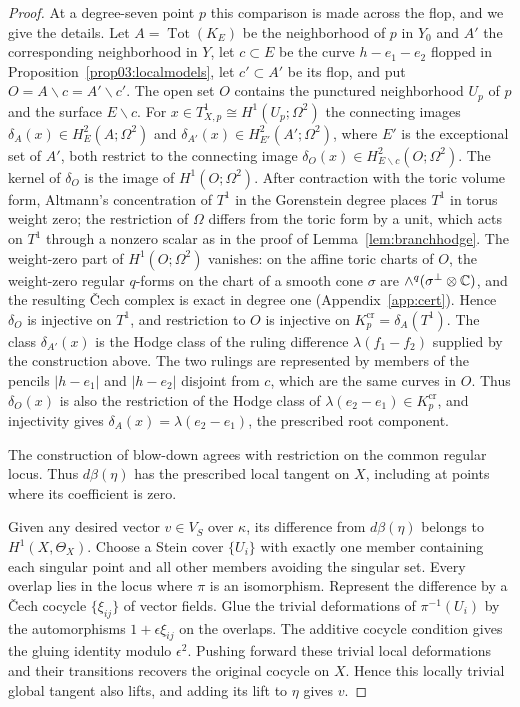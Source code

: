 \begin{proof}
At a degree-seven point $p$ this comparison is made across the flop, and we
give the details.  Let $A=\operatorname{Tot}(K_E)$ be the neighborhood of
$p$ in $Y_0$ and $A'$ the corresponding neighborhood in $Y$, let
$c\subset E$ be the curve $h-e_1-e_2$ flopped in
Proposition~\ref{prop03:localmodels}, let $c'\subset A'$ be its flop, and put
$O=A\smallsetminus c=A'\smallsetminus c'$.  The open set $O$ contains the
punctured neighborhood $U_p$ of $p$ and the surface $E\smallsetminus c$.
For $x\in T^1_{X,p}\cong H^1(U_p;\Omega^2)$ the connecting images
$\delta_A(x)\in H^2_E(A;\Omega^2)$ and
$\delta_{A'}(x)\in H^2_{E'}(A';\Omega^2)$, where $E'$ is the exceptional set of
$A'$, both restrict to the connecting image
$\delta_O(x)\in H^2_{E\smallsetminus c}(O;\Omega^2)$.  The kernel of
$\delta_O$ is the image of $H^1(O;\Omega^2)$.  After contraction with the
toric volume form, Altmann's concentration of $T^1$ in the Gorenstein degree
places $T^1$ in torus weight zero; the restriction of $\Omega$ differs from
the toric form by a unit, which acts on $T^1$ through a nonzero scalar as in
the proof of Lemma~\ref{lem:branchhodge}.  The weight-zero part of
$H^1(O;\Omega^2)$ vanishes: on the affine toric charts of $O$, the
weight-zero regular $q$-forms on the chart of a smooth cone $\sigma$ are
$\wedge^q(\sigma^\perp\otimes\mathbb{C})$, and the resulting \v{C}ech complex is
exact in degree one (Appendix~\ref{app:cert}).  Hence $\delta_O$ is
injective on $T^1$, and restriction to $O$ is injective on
$K_p^{\mathrm{cr}}=\delta_A(T^1)$.  The class $\delta_{A'}(x)$ is the Hodge
class of the ruling difference $\lambda(f_1-f_2)$ supplied by the
construction above.  The two rulings are represented by members of the
pencils $|h-e_1|$ and $|h-e_2|$ disjoint from $c$, which are the same curves
in $O$.  Thus $\delta_O(x)$ is also the restriction of the Hodge class of
$\lambda(e_2-e_1)\in K_p^{\mathrm{cr}}$, and injectivity gives
$\delta_A(x)=\lambda(e_2-e_1)$, the prescribed root component.

The construction of blow-down agrees with restriction on the common
regular locus.  Thus $d\beta(\eta)$ has the prescribed local
tangent on $X$, including at points where its coefficient is zero.

Given any desired vector $v\in V_S$ over $\kappa$, its difference
from $d\beta(\eta)$ belongs to $H^1(X,\Theta_X)$.  Choose a Stein
cover $\{U_i\}$ with exactly one member containing each singular
point and all other members avoiding the singular set.  Every overlap
lies in the locus where $\pi$ is an isomorphism.  Represent the
difference by a \v{C}ech cocycle $\{\xi_{ij}\}$ of vector fields.
Glue the trivial deformations of $\pi^{-1}(U_i)$ by the
automorphisms $1+\epsilon\xi_{ij}$ on the overlaps.  The additive
cocycle condition gives the gluing identity modulo $\epsilon^2$.
Pushing forward these trivial local deformations and their transitions
recovers the original cocycle on $X$.  Hence this locally trivial
global tangent also lifts, and adding its lift to $\eta$ gives $v$.
\end{proof}

